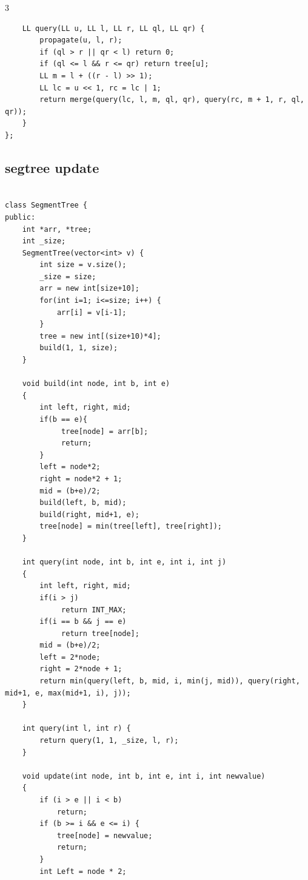 \documentclass[twoside]{article}
\begin{document}
\begin{multicols*}{3}
\begin{verbatim}
    LL query(LL u, LL l, LL r, LL ql, LL qr) {
        propagate(u, l, r);
        if (ql > r || qr < l) return 0;
        if (ql <= l && r <= qr) return tree[u];
        LL m = l + ((r - l) >> 1);
        LL lc = u << 1, rc = lc | 1;
        return merge(query(lc, l, m, ql, qr), query(rc, m + 1, r, ql, qr));
    }
};

\end{verbatim}

{
\subsection*{segtree update}
}
\begin{verbatim}

class SegmentTree {
public:
    int *arr, *tree;
    int _size;
    SegmentTree(vector<int> v) {
        int size = v.size();
        _size = size;
        arr = new int[size+10];
        for(int i=1; i<=size; i++) {
            arr[i] = v[i-1];
        }
        tree = new int[(size+10)*4];
        build(1, 1, size);
    }

    void build(int node, int b, int e)
    {
        int left, right, mid;
        if(b == e){
             tree[node] = arr[b];
             return;
        }
        left = node*2;
        right = node*2 + 1;
        mid = (b+e)/2;
        build(left, b, mid);
        build(right, mid+1, e);
        tree[node] = min(tree[left], tree[right]);
    }

    int query(int node, int b, int e, int i, int j)
    {
        int left, right, mid;
        if(i > j)
             return INT_MAX;
        if(i == b && j == e)
             return tree[node];
        mid = (b+e)/2;
        left = 2*node;
        right = 2*node + 1;
        return min(query(left, b, mid, i, min(j, mid)), query(right, mid+1, e, max(mid+1, i), j));
    }

    int query(int l, int r) {
        return query(1, 1, _size, l, r);
    }

    void update(int node, int b, int e, int i, int newvalue)
    {
        if (i > e || i < b)
            return; 
        if (b >= i && e <= i) {
            tree[node] = newvalue;
            return;
        }
        int Left = node * 2; 
        

\end{verbatim}
\end{multicols*}
\end{document}
